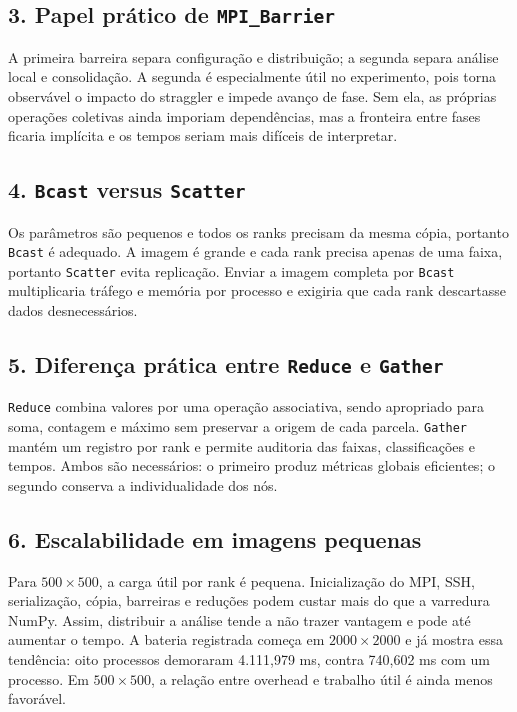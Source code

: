 \documentclass[12pt,a4paper]{article}
\begin{document}
\subsection*{3. Papel prático de \texttt{MPI\_Barrier}}
A primeira barreira separa configuração e distribuição; a segunda separa
análise local e consolidação. A segunda é especialmente útil no experimento,
pois torna observável o impacto do straggler e impede avanço de fase. Sem ela,
as próprias operações coletivas ainda imporiam dependências, mas a fronteira
entre fases ficaria implícita e os tempos seriam mais difíceis de interpretar.

\subsection*{4. \texttt{Bcast} versus \texttt{Scatter}}
Os parâmetros são pequenos e todos os ranks precisam da mesma cópia, portanto
\texttt{Bcast} é adequado. A imagem é grande e cada rank precisa apenas de uma
faixa, portanto \texttt{Scatter} evita replicação. Enviar a imagem completa por
\texttt{Bcast} multiplicaria tráfego e memória por processo e exigiria que cada
rank descartasse dados desnecessários.

\subsection*{5. Diferença prática entre \texttt{Reduce} e \texttt{Gather}}
\texttt{Reduce} combina valores por uma operação associativa, sendo apropriado
para soma, contagem e máximo sem preservar a origem de cada parcela.
\texttt{Gather} mantém um registro por rank e permite auditoria das faixas,
classificações e tempos. Ambos são necessários: o primeiro produz métricas
globais eficientes; o segundo conserva a individualidade dos nós.

\subsection*{6. Escalabilidade em imagens pequenas}
Para $500\times500$, a carga útil por rank é pequena. Inicialização do MPI,
SSH, serialização, cópia, barreiras e reduções podem custar mais do que a
varredura NumPy. Assim, distribuir a análise tende a não trazer vantagem e pode
até aumentar o tempo. A bateria registrada começa em $2000\times2000$ e já
mostra essa tendência: oito processos demoraram 4.111,979 ms, contra 740,602 ms
com um processo. Em $500\times500$, a relação entre overhead e trabalho útil é
ainda menos favorável.
\end{document}
